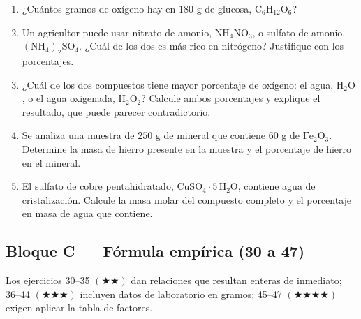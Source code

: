 \documentclass[12pt, letterpaper]{article}
\begin{document}
\begin{enumerate}[leftmargin=*, start=15]
  \item \dificil{}\hspace{0.55em}¿Cuántos gramos de oxígeno hay en $180$ g de glucosa, $\text{C}_6\text{H}_{12}\text{O}_6$?

  \item \dificil{}\hspace{0.55em}Un agricultor puede usar nitrato de amonio, $\text{NH}_4\text{NO}_3$, o sulfato de amonio, $(\text{NH}_4)_2\text{SO}_4$. ¿Cuál de los dos es más rico en nitrógeno? Justifique con los porcentajes.

  \item \muyDificil{}\hspace{0.55em}¿Cuál de los dos compuestos tiene mayor porcentaje de oxígeno: el agua, $\text{H}_2\text{O}$, o el agua oxigenada, $\text{H}_2\text{O}_2$? Calcule ambos porcentajes y explique el resultado, que puede parecer contradictorio.

  \item \muyDificil{}\hspace{0.55em}Se analiza una muestra de $250$ g de mineral que contiene $60$ g de $\text{Fe}_2\text{O}_3$. Determine la masa de hierro presente en la muestra y el porcentaje de hierro en el mineral.

  \item \muyDificil{}\hspace{0.55em}El sulfato de cobre pentahidratado, $\text{CuSO}_4\cdot5\,\text{H}_2\text{O}$, contiene agua de cristalización. Calcule la masa molar del compuesto completo y el porcentaje en masa de agua que contiene.

\end{enumerate}

\subsection{Bloque C — Fórmula empírica (30 a 47)}

\noindent Los ejercicios 30--35 $(\bigstar\bigstar)$ dan relaciones que resultan enteras de inmediato; 36--44 $(\bigstar\bigstar\bigstar)$ incluyen datos de laboratorio en gramos; 45--47 $(\bigstar\bigstar\bigstar\bigstar)$ exigen aplicar la tabla de factores.
\end{document}
